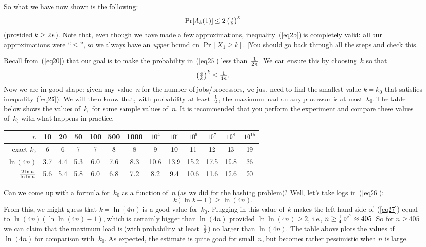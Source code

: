 \documentclass[11pt]{article}
\def\half{{\textstyle{1\over 2}}}
\def\quarter{{\textstyle{1\over 4}}}
\begin{document}
So what we have now shown is the following:  
\begin{equation}\label{eq25}
   \Pr[A_k(1)] \le 2\left({\textstyle{\mathop{\mathrm{e}}\nolimits\over k}}\right)^k
\end{equation}
(provided $k\ge 2\mathop{\mathrm{e}}\nolimits$).
Note that, even though we have made a few approximations, 
inequality~(\ref{eq25}) is completely valid: all our approximations 
were ``$\le$'', so we always have an {\it upper\/} bound on 
$\Pr[X_1\ge k]$.  [You should go back through all the steps and check 
this.]

Recall from~(\ref{eq20}) that our goal is to make the probability
in~(\ref{eq25}) less than~$1\over{2n}$.  We can ensure this by choosing~$k$
so that
\begin{equation}\label{eq26}
  \left({\textstyle{\mathop{\mathrm{e}}\nolimits\over k}}\right)^k \le {\textstyle{1\over{4n}}}.
\end{equation}
Now we are in good shape: given any value~$n$ for the number of 
jobs/processors, we just need to find the smallest value $k=k_0$ that
satisfies inequality~(\ref{eq26}).  We will then know that, with
probability at least~$\half$, the maximum load on any processor is 
at most~$k_0$.  The table below shows the values of~$k_0$ for some
sample values of~$n$.  It is recommended that you perform
the experiment and compare these values of~$k_0$ with what
happens in practice.
\begin{center}\begin{tabular}{|r|cccccccccccc|}
\hline
$n$           &10&20&50&100&500&1000&$10^4$&$10^5$&$10^6$&$10^7$&$10^8$&$10^{15}$\\\hline
exact $k_0$   &6&6&7&7&8&8&9&10&11&12&13&19\\
$\ln(4n)$     &3.7&4.4&5.3&6.0&7.6&8.3&10.6&13.9&15.2&17.5&19.8&36\\
${{2\ln n}\over{\ln\ln n}}$
              &5.6&5.4&5.8&6.0&6.8&7.2&8.2&9.4&10.6&11.6&12.6&20\\[2pt]\hline
\end{tabular}\end{center}

Can we come up with a formula for~$k_0$ as a function of~$n$ (as we
did for the hashing problem)?  Well, let's take logs in~(\ref{eq26}):
\begin{equation}\label{eq27}
   k(\ln k -1) \ge \ln(4n).
\end{equation}
From this, we might guess that $k=\ln(4n)$ is a good value for~$k_0$.
Plugging in this value of~$k$ makes the left-hand side of~(\ref{eq27})
equal to $\ln(4n)(\ln\ln(4n) -1)$, which is certainly bigger than $\ln(4n)$
provided $\ln\ln(4n)\ge 2$, i.e., $n\ge\quarter\e^{\e^2}\approx 405$.
So for $n\ge 405$ we can claim that the maximum load is (with probability
at least~$\half$) no larger than $\ln(4n)$.  The table above plots the
values of $\ln(4n)$ for comparison with~$k_0$.  As expected, the estimate
is quite good for small~$n$, but becomes rather pessimistic when $n$ is large.
\end{document}
